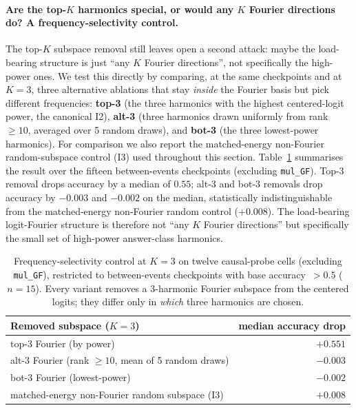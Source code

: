 \documentclass{article}
\begin{document}
\paragraph{Are the top-$K$ harmonics special, or would any $K$ Fourier directions do? A frequency-selectivity control.}
The top-$K$ subspace removal still leaves open a second attack: maybe
the load-bearing structure is just ``any $K$ Fourier directions'',
not specifically the high-power ones. We test this directly by
comparing, at the same checkpoints and at $K{=}3$, three alternative
ablations that stay \emph{inside} the Fourier basis but pick
different frequencies:
\textbf{top-3} (the three harmonics with the highest centered-logit
power, the canonical I2),
\textbf{alt-3} (three harmonics drawn uniformly from rank
$\geq 10$, averaged over 5 random draws), and
\textbf{bot-3} (the three lowest-power harmonics).
For comparison we also report the matched-energy non-Fourier
random-subspace control (I3) used throughout this section.
Table~\ref{tab:freq_selectivity} summarises the result over the
fifteen between-events checkpoints (excluding \texttt{mul\_GF}).
Top-3 removal drops accuracy by a median of $0.55$; alt-3 and
bot-3 removals drop accuracy by $-0.003$ and $-0.002$ on the
median, statistically indistinguishable from the matched-energy
non-Fourier random control ($+0.008$).
The load-bearing logit-Fourier structure is therefore not ``any
$K$ Fourier directions'' but specifically the small set of
high-power answer-class harmonics.

\begin{table}[h]
  \centering
  \small
  \caption{Frequency-selectivity control at $K{=}3$ on twelve
    causal-probe cells (excluding \texttt{mul\_GF}), restricted to
    between-events checkpoints with base accuracy~$>0.5$ ($n{=}15$).
    Every variant removes a 3-harmonic Fourier subspace from the
    centered logits; they differ only in \emph{which} three
    harmonics are chosen.}
  \label{tab:freq_selectivity}
  \begin{tabular}{lr}
    \toprule
    Removed subspace ($K{=}3$) & median accuracy drop \\
    \midrule
    top-3 Fourier (by power) & $+0.551$ \\
    alt-3 Fourier (rank $\geq 10$, mean of 5 random draws) & $-0.003$ \\
    bot-3 Fourier (lowest-power) & $-0.002$ \\
    matched-energy non-Fourier random subspace (I3) & $+0.008$ \\
    \bottomrule
  \end{tabular}
\end{table}
\FloatBarrier
\end{document}
